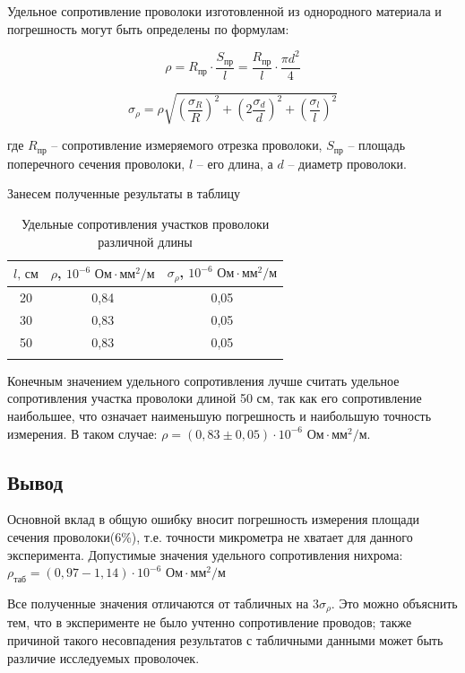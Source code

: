 \documentclass[a4paper, 12pt]{article}
\begin{document}
Удельное сопротивление проволоки изготовленной из однородного материала и погрешность могут быть определены по формулам:

\begin{minipage}{0.45\textwidth}
	\centering
	\begin{equation}
		\rho = R_\text{пр}\cdot\frac{S_\text{пр}}{l} = \frac{R_\text{пр}}{l} \cdot \frac{\pi d^2}{4}
	\end{equation}
\end{minipage}
\begin{minipage}{0.45\textwidth}
	\centering
	\begin{equation}
		\sigma_\rho = \rho\sqrt{\left(\frac{\sigma_R}{R}\right)^2 + \left( 2\frac{\sigma_d}{d} \right)^2 + \left( \frac{\sigma_l}{l}\right)^2}
	\end{equation}
	
\end{minipage}

\bigskip
\noindent где $R_\text{пр}$ -- сопротивление измеряемого отрезка проволоки, $S_\text{пр}$ -- площадь поперечного сечения проволоки, $l$ -- его длина, а $d$ -- диаметр проволоки.

Занесем полученные результаты в таблицу
\begin{longtable}[H]{|c||c||c|}
	\hline
	$l \text{, см}$ & $\rho$, $ 10^{-6} \text{ Ом} \cdot \text{мм}^2 /\text{м}$ & $\sigma_\rho$, $ 10^{-6} \text{ Ом} \cdot \text{мм}^2 / \text{м}$\\
	\hline
	20 & 0,84 & 0,05\\
	\hline
	30 & 0,83 & 0,05\\
	\hline
	50 & 0,83 & 0,05\\
	\hline
	\caption{Удельные сопротивления участков проволоки различной длины}
\end{longtable}

Конечным значением удельного сопротивления лучше считать удельное сопротивления участка проволоки длиной 50 см, так как его сопротивление наибольшее, что означает наименьшую погрешность и наибольшую точность измерения. В таком случае: $\rho = \left( 0,83 \pm 0,05 \right) \cdot 10^{-6} \text{ Ом}\cdot \text{мм}^2/\text{м}$.

\subsection{Вывод}
Основной вклад в общую ошибку вносит погрешность измерения площади сечения проволоки(6\%), т.е. точности микрометра не хватает для данного эксперимента.
Допустимые значения удельного сопротивления нихрома: $\rho_\text{таб} = (0,97 - 1,14) \cdot 10^{-6} \text{ Ом}\cdot \text{мм}^2/\text{м}$ 	

Все полученные значения отличаются от табличных на $3\sigma_\rho$. Это можно объяснить тем, что в эксперименте не было учтенно сопротивление проводов; также причиной такого несовпадения результатов с табличными данными может быть различие исследуемых проволочек.
\end{document}
